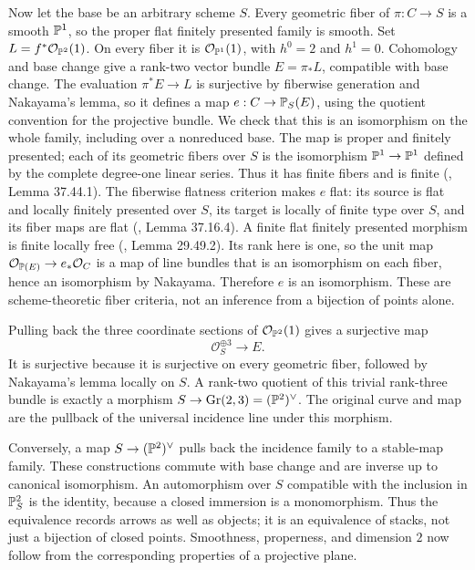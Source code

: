 Now let the base be an arbitrary scheme $S$. Every geometric fiber of $\pi:C\to S$ is a smooth $\mathbb P^1$, so the proper flat finitely presented family is smooth. Set $L=f^*\mathcal O_{\mathbb P^2}(1)$. On every fiber it is $\mathcal O_{\mathbb P^1}(1)$, with $h^0=2$ and $h^1=0$. Cohomology and base change give a rank-two vector bundle $E=\pi_*L$, compatible with base change. The evaluation $\pi^*E\to L$ is surjective by fiberwise generation and Nakayama's lemma, so it defines a map $e:C\to\mathbb P_S(E)$, using the quotient convention for the projective bundle. We check that this is an isomorphism on the whole family, including over a nonreduced base. The map is proper and finitely presented; each of its geometric fibers over $S$ is the isomorphism $\mathbb P^1\to\mathbb P^1$ defined by the complete degree-one linear series. Thus it has finite fibers and is finite (, Lemma 37.44.1). The fiberwise flatness criterion makes $e$ flat: its source is flat and locally finitely presented over $S$, its target is locally of finite type over $S$, and its fiber maps are flat (, Lemma 37.16.4). A finite flat finitely presented morphism is finite locally free (, Lemma 29.49.2). Its rank here is one, so the unit map $\mathcal O_{\mathbb P(E)}\to e_*\mathcal O_C$ is a map of line bundles that is an isomorphism on each fiber, hence an isomorphism by Nakayama. Therefore $e$ is an isomorphism. These are scheme-theoretic fiber criteria, not an inference from a bijection of points alone.

Pulling back the three coordinate sections of $\mathcal O_{\mathbb P^2}(1)$ gives a surjective map
\[
 \mathcal O_S^{\oplus3}\longrightarrow E.
\]
It is surjective because it is surjective on every geometric fiber, followed by Nakayama's lemma locally on $S$. A rank-two quotient of this trivial rank-three bundle is exactly a morphism $S\to\operatorname{Gr}(2,3)=(\mathbb P^2)^\vee$. The original curve and map are the pullback of the universal incidence line under this morphism.

Conversely, a map $S\to(\mathbb P^2)^\vee$ pulls back the incidence family to a stable-map family. These constructions commute with base change and are inverse up to canonical isomorphism. An automorphism over $S$ compatible with the inclusion in $\mathbb P^2_S$ is the identity, because a closed immersion is a monomorphism. Thus the equivalence records arrows as well as objects; it is an equivalence of stacks, not just a bijection of closed points. Smoothness, properness, and dimension $2$ now follow from the corresponding properties of a projective plane.

